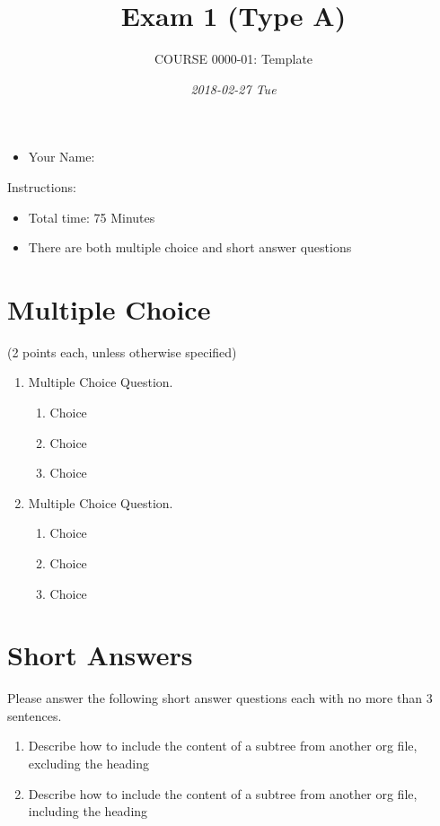 \documentclass[article,letterpaper,times,10pt,listings-bw,microtype]{article}
\author{COURSE 0000-01: Template}
\date{\textit{2018-02-27 Tue}}
\title{Exam 1 (Type A)}
\begin{document}
\maketitle
\vspace{20 mm}

\begin{itemize}
\item Your Name: \underline{\hspace{4cm}}
\end{itemize}

\vspace{20 mm}

Instructions:

\begin{itemize}
\item Total time: 75 Minutes
\item There are both multiple choice and short answer questions
\end{itemize}
\clearpage
\section*{Multiple Choice}
\label{sec:org9d1c75b}
(2 points each, unless otherwise specified)
\begin{enumerate}
\item Multiple Choice Question.
\begin{enumerate}
\item Choice
\item Choice
\item Choice
\end{enumerate}

\item Multiple Choice Question.
\begin{enumerate}
\item Choice
\item Choice
\item Choice
\end{enumerate}
\end{enumerate}
\clearpage
\section*{Short Answers}
\label{sec:orgac85f18}
\begin{mdframed}[style=exampledefault, frametitle={}]
Please answer the following short answer questions each with no more than 3
sentences.
\end{mdframed}

\begin{enumerate}
\item Describe how to include the content of a subtree from another org file, excluding the heading

\vspace{50 mm}

\item Describe how to include the content of a subtree from another org file, including the heading
\end{enumerate}
\end{document}
